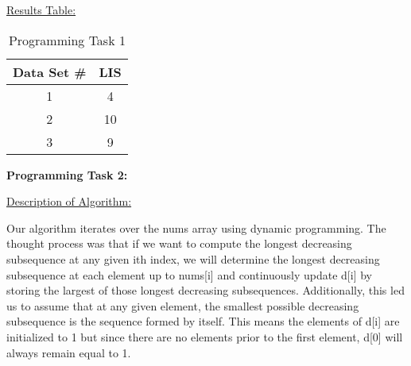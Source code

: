 \documentclass[12pt,letterpaper,final]{report}
\begin{document}
\underline{Results Table:}

\begin{table}[H]
    \centering
    \begin{tabular}{|c|c|}
    \hline
    Data Set \# & LIS \\
    \hline
    1 & 4 \\
    \hline
    2 & 10 \\
    \hline
    3 & 9 \\
    \hline
    \end{tabular}
    \caption{Programming Task 1}
    \label{tab:my_table}
\end{table}
\bigskip







\bigskip

\bigskip



\noindent\textbf{Programming Task 2:} 
\medskip

\underline{Description of Algorithm:}

Our algorithm iterates over the nums array using dynamic programming. The thought process was that if we want to compute the longest decreasing subsequence at any given ith index, we will determine the longest decreasing subsequence at each element up to nums[i] and continuously update d[i] by storing the largest of those longest decreasing subsequences. Additionally, this led us to assume that at any given element, the smallest possible decreasing subsequence is the sequence formed by itself. This means the elements of d[i] are initialized to 1 but since there are no elements prior to the first element, d[0] will always remain equal to 1.
\end{document}
